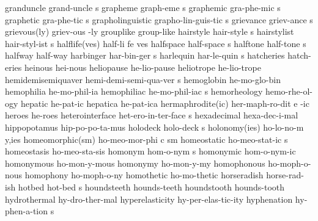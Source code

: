 \5 granduncle		grand-uncle s		%
\NewWordtrue
\5 grapheme		graph-eme s		%
\NewWordtrue
\5 graphemic		gra-phe-mic s		%
\NewWordtrue
\5 graphetic		gra-phe-tic s		%
\NewWordtrue
\5 grapholinguistic	grapho-lin-guis-tic s	%
\5 grievance		griev-ance s
\2 grievous(ly) 	griev-ous -ly
\1 grouplike		group-like
\5 hairstyle		hair-style s
\5 hairstylist		hair-styl-ist s
\3 halflife(ves)	half-li fe ves		%
\5 halfspace		half-space s            %
\5 halftone		half-tone s		%
\1 halfway		half-way		%
\5 harbinger		har-bin-ger s
\5 harlequin		har-le-quin s
\1 hatcheries		hatch-eries
\1 heinous		hei-nous		%
\1 heliopause		he-lio-pause		%
\1 heliotrope		he-lio-trope		%
\5 hemidemisemiquaver	hemi-demi-semi-qua-ver s	%
\1 hemoglobin		he-mo-glo-bin
\1 hemophilia		he-mo-phil-ia
\5 hemophiliac		he-mo-phil-iac s	%
\1 hemorheology 	hemo-rhe-ol-ogy
\1 hepatic		he-pat-ic
\1 hepatica		he-pat-ica		%
\3 hermaphrodite(ic)	her-maph-ro-dit e -ic
\1 heroes		he-roes
\NewWordtrue
\5 heterointerface	het-ero-in-ter-face s	%
\1 hexadecimal		hexa-dec-i-mal
\1 hippopotamus 	hip-po-po-ta-mus	%
\5 holodeck		holo-deck s		%
\2 holonomy(ies)	ho-lo-no-m y,ies
\3 homeomorphic(sm)	ho-meo-mor-phi c sm	%
\5 homeostatic		ho-meo-stat-ic s	%
\1 homeostasis		ho-meo-sta-sis		%
\NewWordtrue
\5 homonym		hom-o-nym s		%
\NewWordtrue
\1 homonymic		hom-o-nym-ic		%
\NewWordtrue
\1 homonymous		ho-mon-y-mous		%
\NewWordtrue
\1 homonymy		ho-mon-y-my		%
\NewWordtrue
\1 homophonous		ho-moph-o-nous		%
\NewWordtrue
\1 homophony		ho-moph-o-ny		%
\1 homothetic		ho-mo-thetic
\1 horseradish		horse-rad-ish
\5 hotbed		hot-bed s		%
\1 houndsteeth		hounds-teeth		%
\1 houndstooth		hounds-tooth		%
\1 hydrothermal		hy-dro-ther-mal		%
\1 hyperelasticity	hy-per-elas-tic-ity	%
\5 hyphenation		hy-phen-a-tion s	%
